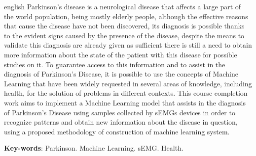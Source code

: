 \begin{resumo}[Abstract]

 \begin{otherlanguage*}{english}
  Parkinson's disease is a neurological disease that affects a large part of the world population, being mostly elderly people, although the effective reasons that cause the disease have not been discovered, its diagnosis is possible thanks to the evident signs caused by the presence of the disease, despite the means to validate this diagnosis are already given as sufficient there is still a need to obtain more information about the state of the patient with this disease for possible studies on it. To guarantee access to this information and to assist in the diagnosis of Parkinson's Disease, it is possible to use the concepts of Machine Learning that have been widely requested in several areas of knowledge, including health, for the solution of problems in different contexts. This course completion work aims to implement a Machine Learning model that assists in the diagnosis of Parkinson's Disease using samples collected by sEMGs devices in order to recognize patterns and obtain new information about the disease in question, using a proposed methodology of construction of machine learning system.

   \vspace{\onelineskip}
 
   \noindent 
   \textbf{Key-words}: Parkinson. Machine Learning. sEMG. Health.
 \end{otherlanguage*}
\end{resumo}
